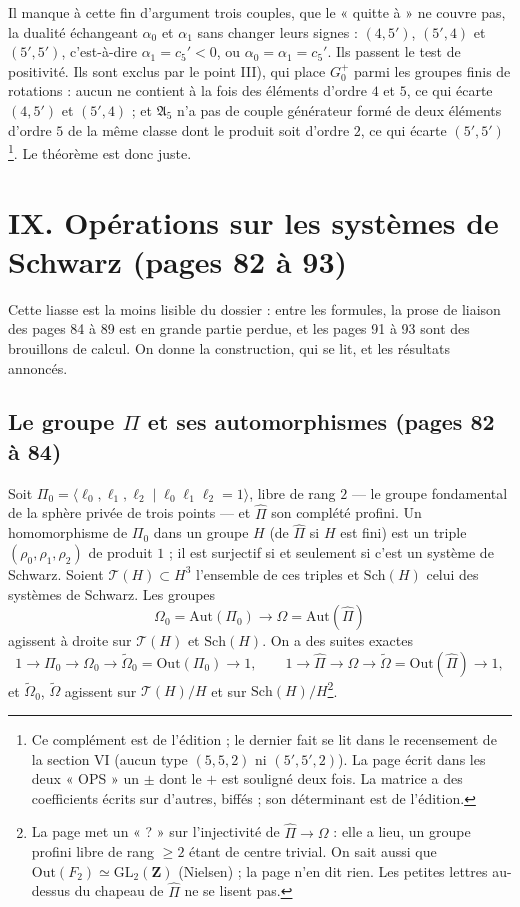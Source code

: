 \documentclass[11pt,a4paper]{article}
\begin{document}
Il manque à cette fin d'argument trois couples, que le « quitte à » ne couvre
pas, la dualité échangeant $\alpha_0$ et $\alpha_1$ sans changer leurs signes :
$(4, 5')$, $(5', 4)$ et $(5', 5')$, c'est-à-dire $\alpha_1 = c_5' < 0$, ou
$\alpha_0 = \alpha_1 = c_5'$. Ils passent le test de positivité. Ils sont exclus
par le point III), qui place $G_0^+$ parmi les groupes finis de rotations :
aucun ne contient à la fois des éléments d'ordre $4$ et $5$, ce qui écarte
$(4, 5')$ et $(5', 4)$ ; et $\mathfrak{A}_5$ n'a pas de couple générateur formé
de deux éléments d'ordre $5$ de la même classe dont le produit soit d'ordre
$2$, ce qui écarte $(5', 5')$\footnote{Ce complément est de l'édition ; le
dernier fait se lit dans le recensement de la section VI (aucun type
$(5, 5, 2)$ ni $(5', 5', 2)$). La page écrit dans les deux « OPS » un $\pm$ dont
le $+$ est souligné deux fois. La matrice a des coefficients écrits sur
d'autres, biffés ; son déterminant est de l'édition.}. Le théorème est donc
juste.

\section*{IX. Opérations sur les systèmes de Schwarz (pages 82 à 93)}

Cette liasse est la moins lisible du dossier : entre les formules, la prose de
liaison des pages 84 à 89 est en grande partie perdue, et les pages 91 à 93 sont
des brouillons de calcul. On donne la construction, qui se lit, et les
résultats annoncés.

\subsection*{Le groupe $\Pi$ et ses automorphismes (pages 82 à 84)}

Soit $\Pi_0 = \langle \ell_0, \ell_1, \ell_2 \mid \ell_0\ell_1\ell_2 = 1\rangle$,
libre de rang $2$ --- le groupe fondamental de la sphère privée de trois
points --- et $\widehat\Pi$ son complété profini. Un homomorphisme de $\Pi_0$
dans un groupe $H$ (de $\widehat\Pi$ si $H$ est fini) est un triple
$(\rho_0, \rho_1, \rho_2)$ de produit $1$ ; il est surjectif si et seulement si
c'est un système de Schwarz. Soient $\mathcal{T}(H) \subset H^3$ l'ensemble de
ces triples et $\mathrm{Sch}(H)$ celui des systèmes de Schwarz. Les groupes
\[
  \Omega_0 = \mathrm{Aut}(\Pi_0) \longrightarrow \Omega = \mathrm{Aut}(\widehat\Pi)
\]
agissent à droite sur $\mathcal{T}(H)$ et $\mathrm{Sch}(H)$. On a des suites
exactes
\[
  1 \to \Pi_0 \to \Omega_0 \to \widetilde\Omega_0 = \mathrm{Out}(\Pi_0) \to 1,
  \qquad 1 \to \widehat\Pi \to \Omega \to \widetilde\Omega =
  \mathrm{Out}(\widehat\Pi) \to 1 ,
\]
et $\widetilde\Omega_0$, $\widetilde\Omega$ agissent sur $\mathcal{T}(H)/H$ et sur
$\mathrm{Sch}(H)/H$\footnote{La page met un « ? » sur l'injectivité de
$\widehat\Pi \to \Omega$ : elle a lieu, un groupe profini libre de rang $\geq 2$
étant de centre trivial. On sait aussi que $\mathrm{Out}(F_2) \simeq
\mathrm{GL}_2(\mathbf{Z})$ (Nielsen) ; la page n'en dit rien. Les petites
lettres au-dessus du chapeau de $\widehat\Pi$ ne se lisent pas.}.
\end{document}
